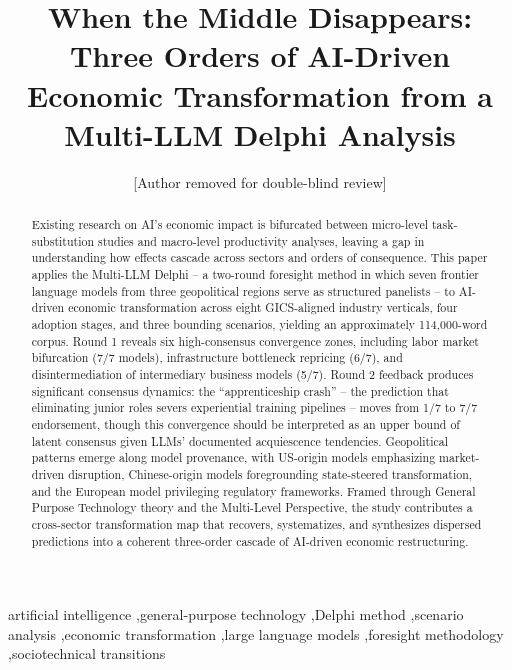 \documentclass[preprint,review,12pt]{elsarticle}
\begin{document}
\begin{frontmatter}

\title{When the Middle Disappears: Three Orders of AI-Driven Economic Transformation from a Multi-LLM Delphi Analysis}

\author[anon]{[Author removed for double-blind review]}

\address[anon]{[Affiliation removed for double-blind review]}

\begin{abstract}
Existing research on AI's economic impact is bifurcated between micro-level task-substitution studies and macro-level productivity analyses, leaving a gap in understanding how effects cascade across sectors and orders of consequence. This paper applies the Multi-LLM Delphi -- a two-round foresight method in which seven frontier language models from three geopolitical regions serve as structured panelists -- to AI-driven economic transformation across eight GICS-aligned industry verticals, four adoption stages, and three bounding scenarios, yielding an approximately 114,000-word corpus. Round 1 reveals six high-consensus convergence zones, including labor market bifurcation (7/7 models), infrastructure bottleneck repricing (6/7), and disintermediation of intermediary business models (5/7). Round 2 feedback produces significant consensus dynamics: the ``apprenticeship crash'' -- the prediction that eliminating junior roles severs experiential training pipelines -- moves from 1/7 to 7/7 endorsement, though this convergence should be interpreted as an upper bound of latent consensus given LLMs' documented acquiescence tendencies. Geopolitical patterns emerge along model provenance, with US-origin models emphasizing market-driven disruption, Chinese-origin models foregrounding state-steered transformation, and the European model privileging regulatory frameworks. Framed through General Purpose Technology theory and the Multi-Level Perspective, the study contributes a cross-sector transformation map that recovers, systematizes, and synthesizes dispersed predictions into a coherent three-order cascade of AI-driven economic restructuring.
\end{abstract}

\begin{keyword}
artificial intelligence \sep general-purpose technology \sep Delphi method \sep scenario analysis \sep economic transformation \sep large language models \sep foresight methodology \sep sociotechnical transitions
\end{keyword}

\end{frontmatter}
\end{document}

